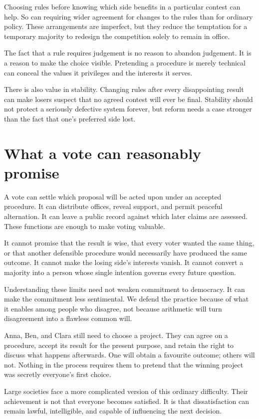 \documentclass[12pt,a4paper]{book}
\begin{document}
Choosing rules before knowing which side benefits in a particular contest can help. So can requiring wider agreement for changes to the rules than for ordinary policy. These arrangements are imperfect, but they reduce the temptation for a temporary majority to redesign the competition solely to remain in office.

The fact that a rule requires judgement is no reason to abandon judgement. It is a reason to make the choice visible. Pretending a procedure is merely technical can conceal the values it privileges and the interests it serves.

There is also value in stability. Changing rules after every disappointing result can make losers suspect that no agreed contest will ever be final. Stability should not protect a seriously defective system forever, but reform needs a case stronger than the fact that one's preferred side lost.

\section*{What a vote can reasonably promise}

A vote can settle which proposal will be acted upon under an accepted procedure. It can distribute offices, reveal support, and permit peaceful alternation. It can leave a public record against which later claims are assessed. These functions are enough to make voting valuable.

It cannot promise that the result is wise, that every voter wanted the same thing, or that another defensible procedure would necessarily have produced the same outcome. It cannot make the losing side's interests vanish. It cannot convert a majority into a person whose single intention governs every future question.

Understanding these limits need not weaken commitment to democracy. It can make the commitment less sentimental. We defend the practice because of what it enables among people who disagree, not because arithmetic will turn disagreement into a flawless common will.

Anna, Ben, and Clara still need to choose a project. They can agree on a procedure, accept its result for the present purpose, and retain the right to discuss what happens afterwards. One will obtain a favourite outcome; others will not. Nothing in the process requires them to pretend that the winning project was secretly everyone's first choice.

Large societies face a more complicated version of this ordinary difficulty. Their achievement is not that everyone becomes satisfied. It is that dissatisfaction can remain lawful, intelligible, and capable of influencing the next decision.
\end{document}
